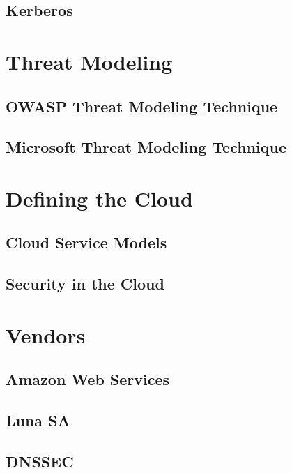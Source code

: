 	\subsection{Kerberos}

\section{Threat Modeling}
	\subsection{OWASP Threat Modeling Technique}

	\subsection{Microsoft Threat Modeling Technique}

\section{Defining the Cloud}
	\subsection{Cloud Service Models}

	\subsection{Security in the Cloud}

\section{Vendors}
	\subsection{Amazon Web Services}

	\subsection{Luna SA}

	\subsection{DNSSEC}

